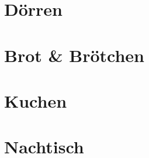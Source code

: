\documentclass[11pt, DIV=15, twoside=false]{scrbook}
\begin{document}
\part{Dörren}


\part{Brot \& Brötchen}



\part{Kuchen}


\part{Nachtisch}


	
\end{document}
